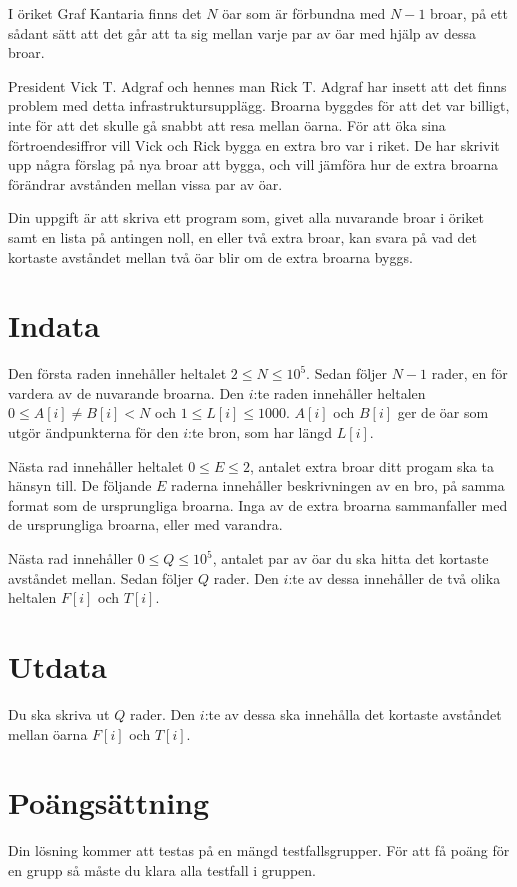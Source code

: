 \def\version{1}
I öriket Graf Kantaria finns det $N$ öar som är förbundna med $N - 1$ broar, på ett sådant sätt att det går att ta sig mellan varje par av öar med hjälp av dessa broar.

President Vick T. Adgraf och hennes man Rick T. Adgraf har insett att det finns problem med detta infrastrukturs\-upplägg.
Broarna byggdes för att det var billigt, inte för att det skulle gå snabbt att resa mellan öarna.
För att öka sina förtroendesiffror vill Vick och Rick bygga en extra bro var i riket.
De har skrivit upp några förslag på nya broar att bygga, och vill jämföra hur de extra broarna förändrar avstånden mellan vissa par av öar.

Din uppgift är att skriva ett program som, givet alla nuvarande broar i öriket samt en lista på antingen noll, en eller två extra broar, kan svara på vad det kortaste avståndet mellan två öar blir om de extra broarna byggs.

\section*{Indata}
Den första raden innehåller heltalet $2 \le N \le 10^5$.
Sedan följer $N - 1$ rader, en för vardera av de nuvarande broarna.
Den $i$:te raden innehåller heltalen $0 \le A[i] \not= B[i] < N$ och $1 \le L[i] \le 1000$.
$A[i]$ och $B[i]$ ger de öar som utgör ändpunkterna för den $i$:te bron, som har längd $L[i]$.

Nästa rad innehåller heltalet $0 \le E \le 2$, antalet extra broar ditt progam ska ta hänsyn till.
De följande $E$ raderna innehåller beskrivningen av en bro, på samma format som de ursprungliga broarna.
Inga av de extra broarna sammanfaller med de ursprungliga broarna, eller med varandra.

Nästa rad innehåller $0 \le Q \le 10^5$, antalet par av öar du ska hitta det kortaste avståndet mellan.
Sedan följer $Q$ rader.
Den $i$:te av dessa innehåller de två olika heltalen $F[i]$ och $T[i]$.

\section*{Utdata}
Du ska skriva ut $Q$ rader.
Den $i$:te av dessa ska innehålla det kortaste avståndet mellan öarna $F[i]$ och $T[i]$.

\section*{Poängsättning}
Din lösning kommer att testas på en mängd testfallsgrupper. För att få poäng för en grupp
så måste du klara alla testfall i gruppen.

